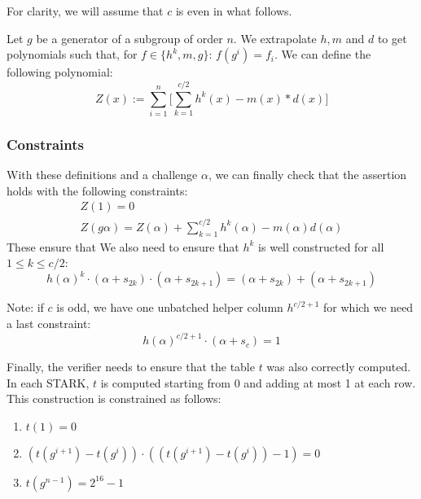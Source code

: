 For clarity, we will assume that $c$ is even in what follows.

Let $g$ be a generator of a subgroup of order $n$. We extrapolate $h, m$ and $d$ to get polynomials such that, for $f \in \{h^k, m, g\}$: $f(g^i) = f_i$.
We can define the following polynomial:
$$ Z(x) :=  \sum_{i=1}^n \big[\sum_{k=1}^{c/2} h^k(x) - m(x) * d(x)\big]$$


\subsubsection{Constraints}
With these definitions and a challenge $\alpha$, we can finally check that the assertion holds with the following constraints:
\begin{gather*}
  Z(1) = 0 \\
  Z(g \alpha) = Z(\alpha) + \sum_{k=1}^{c/2} h^k(\alpha) - m(\alpha) d(\alpha)
\end{gather*}
These ensure that 
We also need to ensure that $h^k$ is well constructed for all $1 \leq k \leq c/2$:
$$
  h(\alpha)^k \cdot (\alpha + s_{2k}) \cdot (\alpha + s_{2k+1}) = (\alpha + s_{2k}) + (\alpha + s_{2k+1})
$$

Note: if $c$ is odd, we have one unbatched helper column $h^{c/2+1}$ for which we need a last constraint:
$$
  h(\alpha)^{c/2+1} \cdot (\alpha + s_{c}) = 1
$$

Finally, the verifier needs to ensure that the table $t$ was also correctly computed. In each STARK, $t$ is computed starting from 0 and adding at most 1 at each row. This construction is constrained as follows:
\begin{enumerate}
  \item $t(1) = 0$
  \item $(t(g^{i+1}) - t(g^{i})) \cdot ((t(g^{i+1}) - t(g^{i})) - 1) = 0$
  \item $t(g^{n-1}) = 2^{16} - 1$
\end{enumerate}
